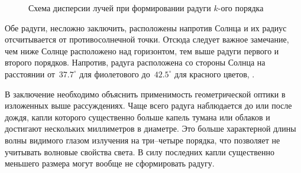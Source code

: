 \begin{figure}[h!]
    \begin{subfigure}{0.3\tw}
        \centering
        \label{pic:rainbow-disp-1}
    \end{subfigure}
    \hfill
    \begin{subfigure}{0.3\tw}
        \centering
        \label{pic:rainbow-disp-2}
    \end{subfigure}
    \hfill
    \begin{subfigure}{0.3\tw}
        \centering
        \label{pic:rainbow-disp-3}
    \end{subfigure}
    \caption{Схема дисперсии лучей при формировании радуги $k$-ого порядка}
\end{figure}

Обе радуги, несложно заключить, расположены напротив Солнца и их радиус отсчитывается от противосолнечной точки. Отсюда следует важное замечание, чем ниже Солнце расположено над горизонтом, тем выше радуги первого и второго порядков. Напротив,  радуга расположена со стороны Солнца на расстоянии от~$37.7^\circ$ для фиолетового до~$42.5^\circ$ для красного цветов, .

В заключение необходимо объяснить применимость геометрической оптики в изложенных выше рассуждениях. Чаще всего радуга наблюдается до или после дождя, капли которого существенно больше капель тумана или облаков и достигают нескольких миллиметров в диаметре. Это больше характерной длины волны видимого глазом излучения на три--четыре порядка, что позволяет не учитывать волновые свойства света. В силу последних капли существенно меньшего размера могут вообще не сформировать радугу. 